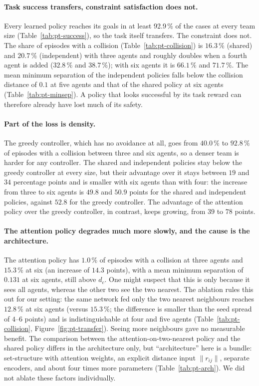 \paragraph{Task success transfers, constraint satisfaction does not.}
Every learned policy reaches its goals in at least 92.9\,\% of the cases at every team size
(Table~\ref{tab:pt-success}), so the task itself transfers. The constraint does not. The share of episodes with a
collision (Table~\ref{tab:pt-collision}) is $16.3\,\%$ (shared) and $20.7\,\%$ (independent) with three agents and
roughly doubles when a fourth agent is added ($32.8\,\%$ and $38.7\,\%$); with six agents it is $66.1\,\%$ and
$71.7\,\%$. The mean minimum separation of the independent policies falls below the collision distance of $0.1$ at five
agents and that of the shared policy at six agents (Table~\ref{tab:pt-minsep}). A policy that looks successful by
its task reward can therefore already have lost much of its safety.

\paragraph{Part of the loss is density.}
The greedy controller, which has no avoidance at all, goes from $40.0\,\%$ to $92.8\,\%$ of episodes with a collision
between three and six agents, so a denser team is harder for any controller. The shared and independent policies
stay below the greedy controller at every size, but their advantage over it stays between $19$ and $34$ percentage points
and is smaller with six agents than with four: the increase from three to six agents is $49.8$ and $50.9$ points for
the shared and independent policies, against $52.8$ for the greedy controller. The advantage of the attention policy
over the greedy controller, in contrast, keeps growing, from $39$ to $78$ points.

\paragraph{The attention policy degrades much more slowly, and the cause is the architecture.}
The attention policy has $1.0\,\%$ of episodes with a collision at three agents and $15.3\,\%$ at six (an increase of
$14.3$ points), with a mean minimum separation of $0.131$ at six agents, still above $d_c$.
One might suspect that this is only because it sees all agents, whereas the other two see the two nearest. The
ablation rules this out for our setting: the same network fed only the two nearest neighbours reaches $12.8\,\%$ at
six agents (versus $15.3\,\%$; the difference is smaller than the seed spread of $4$--$6$ points) and is
indistinguishable at four and five agents (Table~\ref{tab:pt-collision}, Figure~\ref{fig:pt-transfer}). Seeing more
neighbours gave no measurable benefit. The comparison between the attention-on-two-nearest policy and the shared
policy differs in the architecture only, but ``architecture'' here is a bundle: set-structure with attention weights, an
explicit distance input $\|r_{ij}\|$, separate encoders, and about four times more parameters (Table~\ref{tab:pt-arch}).
We did not ablate these factors individually.

